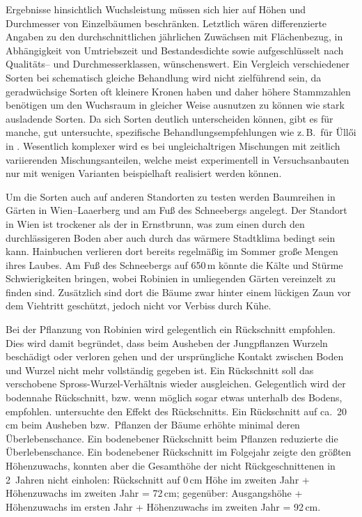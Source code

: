 \documentclass[twocolumn]{scrartcl}
\begin{document}
Ergebnisse hinsichtlich Wuchsleistung müssen sich hier auf Höhen und
Durchmesser von Einzelbäumen beschränken.
Letztlich wären differenzierte Angaben zu den durchschnittlichen jährlichen Zuwächsen mit Flächenbezug,
in Abhängigkeit von Umtriebszeit und Bestandesdichte sowie aufgeschlüsselt nach Qualitäts-- und Durchmesserklassen, wünschenswert.
Ein
Vergleich verschiedener Sorten bei schematisch gleiche Behandlung wird
nicht zielführend sein, da geradwüchsige Sorten oft kleinere Kronen
haben \citep{bujtas1984robinie} und daher höhere Stammzahlen benötigen
um den Wuchsraum in gleicher Weise ausnutzen zu können wie stark
ausladende Sorten. Da sich Sorten deutlich unterscheiden können, gibt
es für manche, gut untersuchte, spezifische Behandlungsempfehlungen wie
z.\,B.\ für Üllői in \cite{redei2020ulloi}. Wesentlich komplexer wird
es bei ungleichaltrigen Mischungen mit zeitlich variierenden
Mischungsanteilen, welche meist experimentell in Versuchsanbauten
nur mit wenigen Varianten beispielhaft realisiert werden können.

Um die Sorten auch auf anderen Standorten zu testen werden Baumreihen in Gärten
in Wien--Laaerberg und am Fuß des Schneebergs angelegt. Der Standort in Wien ist
trockener als der in Ernstbrunn, was zum einen durch den durchlässigeren Boden
aber auch durch das wärmere Stadtklima bedingt sein kann. Hainbuchen verlieren
dort bereits regelmäßig im Sommer große Mengen ihres Laubes. Am Fuß des
Schneebergs auf 650\,m könnte die Kälte und Stürme Schwierigkeiten bringen,
wobei Robinien in umliegenden Gärten vereinzelt zu finden sind. Zusätzlich sind
dort die Bäume zwar hinter einem lückigen Zaun vor dem Viehtritt geschützt,
jedoch nicht vor Verbiss durch Kühe.

Bei der Pflanzung von Robinien wird gelegentlich ein Rückschnitt
empfohlen.
Dies wird damit begründet, dass beim Ausheben der Jungpflanzen Wurzeln beschädigt oder verloren gehen
und der ursprüngliche Kontakt zwischen Boden und Wurzel nicht mehr vollständig gegeben ist.
Ein Rückschnitt soll das verschobene Spross-Wurzel-Verhältnis wieder ausgleichen.
Gelegentlich wird der
bodennahe Rückschnitt, bzw. wenn möglich sogar etwas unterhalb des
Bodens, empfohlen.
\cite{meginnis1940robinieRueckschnitt}
untersuchte den Effekt des Rückschnitts. Ein Rückschnitt auf
ca.\ 20\,cm beim Ausheben bzw.\ Pflanzen der Bäume erhöhte minimal
deren Überlebenschance. Ein bodenebener Rückschnitt beim Pflanzen
reduzierte die Überlebenschance. Ein bodenebener Rückschnitt im
Folgejahr zeigte den größten Höhenzuwachs, konnten aber die Gesamthöhe
der nicht Rückgeschnittenen in 2~Jahren nicht einholen:
Rückschnitt auf 0\,cm Höhe im zweiten Jahr + Höhenzuwachs im zweiten Jahr = 72\,cm;
gegenüber: Ausgangshöhe + Höhenzuwachs im ersten Jahr + Höhenzuwachs im zweiten Jahr = 92\,cm.
\end{document}
